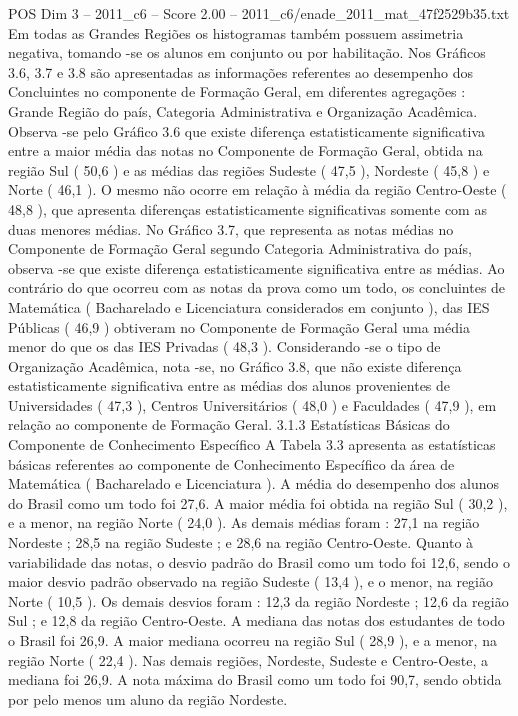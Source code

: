 \begin{textsample}{POS Dim 3 – 2011\_c6 – Score 2.00 – 2011\_c6/enade\_2011\_mat\_47f2529b35.txt}
Em todas as Grandes Regiões os histogramas também possuem assimetria negativa, tomando -se os alunos em conjunto ou por habilitação.
Nos Gráficos 3.6, 3.7 e 3.8 são apresentadas as informações referentes ao desempenho dos Concluintes no componente de Formação Geral, em diferentes agregações : Grande Região do país, Categoria Administrativa e Organização Acadêmica.
Observa -se pelo Gráfico 3.6 que existe diferença estatisticamente significativa entre a maior média das notas no Componente de Formação Geral, obtida na região Sul ( 50,6 ) e as médias das regiões Sudeste ( 47,5 ), Nordeste ( 45,8 ) e Norte ( 46,1 ).
O mesmo não ocorre em relação à média da região Centro-Oeste ( 48,8 ), que apresenta diferenças estatisticamente significativas somente com as duas menores médias.
No Gráfico 3.7, que representa as notas médias no Componente de Formação Geral segundo Categoria Administrativa do país, observa -se que existe diferença estatisticamente significativa entre as médias.
Ao contrário do que ocorreu com as notas da prova como um todo, os concluintes de Matemática ( Bacharelado e Licenciatura considerados em conjunto ), das IES Públicas ( 46,9 ) obtiveram no Componente de Formação Geral uma média menor do que os das IES Privadas ( 48,3 ).
Considerando -se o tipo de Organização Acadêmica, nota -se, no Gráfico 3.8, que não existe diferença estatisticamente significativa entre as médias dos alunos provenientes de Universidades ( 47,3 ), Centros Universitários ( 48,0 ) e Faculdades ( 47,9 ), em relação ao componente de Formação Geral. 3.1.3 Estatísticas Básicas do Componente de Conhecimento Específico A Tabela 3.3 apresenta as estatísticas básicas referentes ao componente de Conhecimento Específico da área de Matemática ( Bacharelado e Licenciatura ).
A média do desempenho dos alunos do Brasil como um todo foi 27,6.
A maior média foi obtida na região Sul ( 30,2 ), e a menor, na região Norte ( 24,0 ).
As demais médias foram : 27,1 na região Nordeste ; 28,5 na região Sudeste ; e 28,6 na região Centro-Oeste.
Quanto à variabilidade das notas, o desvio padrão do Brasil como um todo foi 12,6, sendo o maior desvio padrão observado na região Sudeste ( 13,4 ), e o menor, na região Norte ( 10,5 ).
Os demais desvios foram : 12,3 da região Nordeste ; 12,6 da região Sul ; e 12,8 da região Centro-Oeste.
A mediana das notas dos estudantes de todo o Brasil foi 26,9.
A maior mediana ocorreu na região Sul ( 28,9 ), e a menor, na região Norte ( 22,4 ).
Nas demais regiões, Nordeste, Sudeste e Centro-Oeste, a mediana foi 26,9.
A nota máxima do Brasil como um todo foi 90,7, sendo obtida por pelo menos um aluno da região Nordeste.

\end{textsample}
